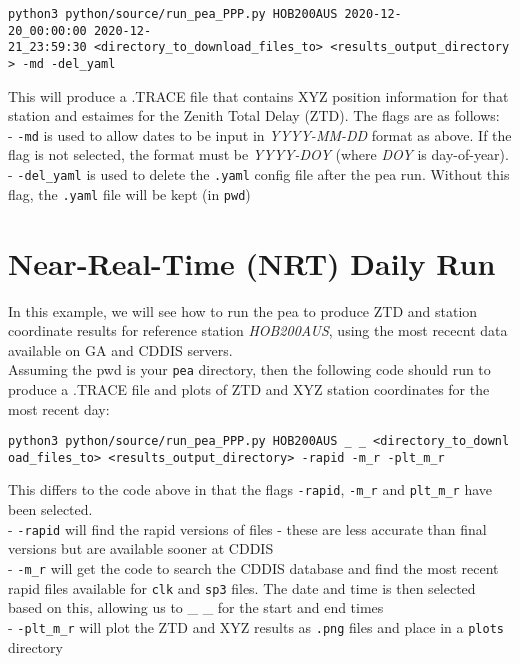 \texttt{python3\ python/source/run\_pea\_PPP.py\ HOB200AUS\ 2020-12-20\_00:00:00\ 2020-12-21\_23:59:30\ \textless{}directory\_to\_download\_files\_to\textgreater{}\ \textless{}results\_output\_directory\textgreater{}\ -md\ -del\_yaml}

This will produce a .TRACE file that contains XYZ position information
for that station and estaimes for the Zenith Total Delay (ZTD). The
flags are as follows:\\
- \texttt{-md} is used to allow dates to be input in \emph{YYYY-MM-DD}
format as above. If the flag is not selected, the format must be
\emph{YYYY-DOY} (where \emph{DOY} is day-of-year).\\
- \texttt{-del\_yaml} is used to delete the \texttt{.yaml} config file
after the pea run. Without this flag, the \texttt{.yaml} file will be
kept (in \texttt{pwd})

\section{Near-Real-Time (NRT) Daily
Run}\label{near-real-time-nrt-daily-run}

In this example, we will see how to run the pea to produce ZTD and
station coordinate results for reference station \emph{HOB200AUS}, using
the most rececnt data available on GA and CDDIS servers.\\
Assuming the pwd is your \texttt{pea} directory, then the following code
should run to produce a .TRACE file and plots of ZTD and XYZ station
coordinates for the most recent day:

\texttt{python3\ python/source/run\_pea\_PPP.py\ HOB200AUS\ \_\ \_\ \textless{}directory\_to\_download\_files\_to\textgreater{}\ \textless{}results\_output\_directory\textgreater{}\ -rapid\ -m\_r\ -plt\_m\_r}

This differs to the code above in that the flags \texttt{-rapid},
\texttt{-m\_r} and \texttt{plt\_m\_r} have been selected.\\
- \texttt{-rapid} will find the rapid versions of files - these are less
accurate than final versions but are available sooner at CDDIS\\
- \texttt{-m\_r} will get the code to search the CDDIS database and find
the most recent rapid files available for \texttt{clk} and \texttt{sp3}
files. The date and time is then selected based on this, allowing us to
\_ \_ for the start and end times\\
- \texttt{-plt\_m\_r} will plot the ZTD and XYZ results as \texttt{.png}
files and place in a \texttt{plots} directory

